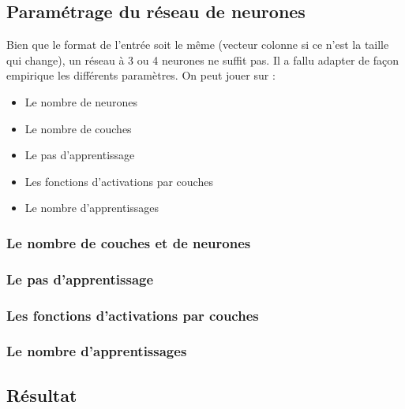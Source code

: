 \subsection{Paramétrage du réseau de neurones}
Bien que le format de l'entrée soit le même (vecteur colonne si ce n'est la taille qui change), un réseau à 3 ou 4 neurones ne suffit pas. Il a fallu adapter de façon empirique les différents paramètres. On peut jouer sur :
\begin{itemize}
  \item Le nombre de neurones
  \item Le nombre de couches
  \item Le pas d'apprentissage
  \item Les fonctions d'activations par couches
  \item Le nombre d'apprentissages
\end{itemize}
\subsubsection{Le nombre de couches et de neurones}

\subsubsection{Le pas d'apprentissage}

\subsubsection{Les fonctions d'activations par couches}

\subsubsection{Le nombre d'apprentissages}

\subsection{Résultat}

